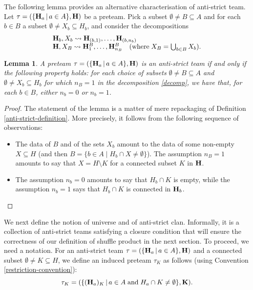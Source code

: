 \documentclass{article}
\theoremstyle{plain}
\newtheorem{lemma}[thm]{Lemma}
\theoremstyle{definition}
\newcommand{\inc}{\subseteq}
\newcommand{\Union}{\bigcup}
\newcommand{\set}[1]{\{#1\}}
\newcommand{\setc}[2]{\set{#1 \mid #2}}
\newcommand{\inter}{\cap}
\newcommand{\hyper}[1]{{\bf #1}}
\begin{document}
The following lemma provides an alternative characterisation of anti-strict team.
Let $\tau=(\{{\bf H}_a\,|\,a\in A\},{\bf H})$ be a preteam. Pick  a   subset $\emptyset\neq B\subseteq A$ and  for each $b\in B$  a subset $\emptyset\neq X_b\subseteq H_b$, and
consider the decompositions
\begin{equation}\begin{array}{l}\hyper{H}_b, X_b \leadsto \hyper{H}_{(b,1)},\ldots ,\hyper{H}_{(b,n_b)}\\
\hyper{H},X_B\leadsto \hyper{H}_1^B,\ldots,\hyper{H}_{n_B}^B\quad(\textrm{where}\; X_B=\Union_{b\in B}X_b).
\end{array}\label{decomp}\end{equation}

 
\begin{lemma} \label{daggerbis}
A preteam $\tau=(\{{\bf H}_a\,|\,a\in A\},{\bf H})$ is an anti-strict team if and only if the following property holds: for each choice of  subsets $\emptyset\neq B\subseteq A$ and   $\emptyset\neq X_b\subseteq H_b$  for which $n_B=1$ in the decomposition \eqref{decomp}, we have that, for each $b\in B$, either $n_b=0$ or $n_b=1$.
\end{lemma}

\begin{proof}
    The statement of the lemma  is a matter of   mere  repackaging of Definition \ref{anti-strict-definition}. More precisely, it follows   from the following sequence of observations:
\begin{itemize}  
\item The data of $B$ and of the sets  $X_b$ amount to the data of some non-empty $X\inc H$ (and then $B=\setc{b\in A}{H_b\inter X\neq\emptyset}$). 
The assumption $n_B=1$ amounts to say that $X=H\setminus K$ for a connected subset $K$ in $\hyper{H}$. 
\item The assumption $n_b=0$ amounts to say that $H_b \inter K$ is empty, while the assumption $n_b=1$ says that
$H_b \inter K$ is connected in $\hyper{H}_b$.
\end{itemize}
 \end{proof}

  We next define the notion of universe and of anti-strict clan. Informally, it is a collection of anti-strict teams satisfying a closure condition that  will ensure the correctness of our definition of shuffle product in the next section.
To proceed, we need a notation.
For an anti-strict team $\tau=(\{{\bf H}_a\,|\, a\in A\},{\bf H})$ and a connected subset $\emptyset \neq K\subseteq H$,  we define an induced preteam $\tau_K$ as follows  (using Convention \ref{restriction-convention}):
\begin{equation}\tau_K=(\{{(\hyper{H}_{{a}})_{K}\,|\,  a \in  A\;\mbox{and}\;H_{{a}}\inter K\neq\emptyset\},{\bf K}}).\label{lll}\end{equation} 
 
\end{document}
